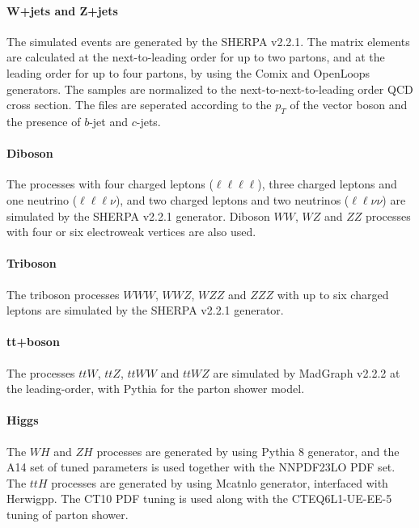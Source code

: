 \paragraph{\bf W+jets and Z+jets}
The simulated events are generated by the {\sc SHERPA} v2.2.1.
The matrix elements are calculated at the next-to-leading order for up to two partons, and at the leading order for up to four partons, by using the {\sc Comix} and {\sc OpenLoops} generators.
The samples are normalized to the next-to-next-to-leading order QCD cross section.
The files are seperated according to the $p_T$ of the vector boson and the presence of $b$-jet and $c$-jets.

\paragraph{\bf Diboson}
The processes with four charged leptons ($\ell \ell \ell \ell$), three charged leptons and one neutrino ($\ell \ell \ell \nu$), and two charged leptons and two neutrinos ($\ell \ell \nu \nu$) are simulated by the {\sc SHERPA} v2.2.1 generator.
Diboson $WW$, $WZ$ and $ZZ$ processes with four or six electroweak vertices are also used.

\paragraph{\bf Triboson}
The triboson processes $WWW$, $WWZ$, $WZZ$ and $ZZZ$ with up to six charged leptons are simulated by the {\sc SHERPA} v2.2.1 generator.

\paragraph{\bf tt+boson}
The processes $ttW$, $ttZ$, $ttWW$ and $ttWZ$ are simulated by {\sc MadGraph} v2.2.2 at the leading-order, with {\sc Pythia} for the parton shower model.

\paragraph{\bf Higgs}
The $WH$ and $ZH$ processes are generated by using {\sc Pythia} 8 generator, and the {\sc A14} set of tuned parameters is used together with the {\sc NNPDF23LO} PDF set.
The $ttH$ processes are generated by using {\sc Mcatnlo} generator, interfaced with {\sc Herwigpp}.
The CT10 PDF tuning is used along with the CTEQ6L1-UE-EE-5 tuning of parton shower.

